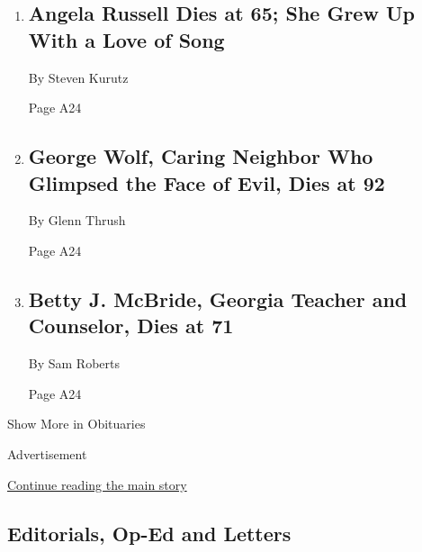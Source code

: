 \begin{enumerate}
\def\labelenumi{\arabic{enumi}.}
\item
  \href{/2020/09/04/obituaries/angela-russell-dead-coronavirus.html}{}

  \hypertarget{angela-russell-dies-at-65-she-grew-up-with-a-love-of-song}{%
  \subsection{Angela Russell Dies at 65; She Grew Up With a Love of
  Song}\label{angela-russell-dies-at-65-she-grew-up-with-a-love-of-song}}

  By Steven Kurutz

  Page A24
\item
  \href{/2020/09/01/obituaries/george-wolf-dead-coronavirus.html}{}

  \hypertarget{george-wolf-caring-neighbor-who-glimpsed-the-face-of-evil-dies-at-92}{%
  \subsection{George Wolf, Caring Neighbor Who Glimpsed the Face of
  Evil, Dies at
  92}\label{george-wolf-caring-neighbor-who-glimpsed-the-face-of-evil-dies-at-92}}

  By Glenn Thrush

  Page A24
\item
  \href{/2020/09/02/obituaries/betty-j-mcbride-dead-coronavirus.html}{}

  \hypertarget{betty-j-mcbride-georgia-teacher-and-counselor-dies-at-71}{%
  \subsection{Betty J. McBride, Georgia Teacher and Counselor, Dies at
  71}\label{betty-j-mcbride-georgia-teacher-and-counselor-dies-at-71}}

  By Sam Roberts

  Page A24
\end{enumerate}

Show More in Obituaries

Advertisement

\protect\hyperlink{after-mid3}{Continue reading the main story}

\hypertarget{editorials-op-ed-and-letters}{%
\subsection{Editorials, Op-Ed and
Letters}\label{editorials-op-ed-and-letters}}


